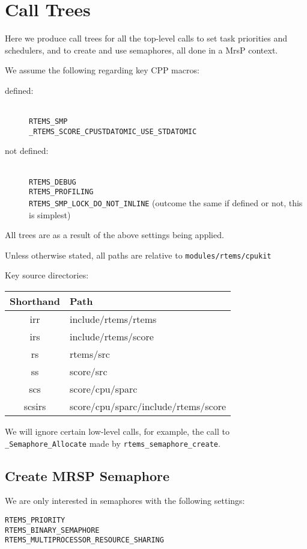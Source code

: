 \section{Call Trees}\label{sec:calltrees}

Here we produce call trees for all the top-level
calls to set task priorities and schedulers,
and to create and use semaphores,
all done in a MrsP context.

We assume the following regarding key CPP macros:
\begin{description}
  \item [defined:]~
    \\ \verb"RTEMS_SMP"
    \\ \verb"_RTEMS_SCORE_CPUSTDATOMIC_USE_STDATOMIC"
  \item [not defined:]~
    \\ \verb"RTEMS_DEBUG"
    \\ \verb"RTEMS_PROFILING"
    \\ \verb"RTEMS_SMP_LOCK_DO_NOT_INLINE"
      (outcome the same if defined or not, this is simplest)
\end{description}
All trees are as a result of the above settings being applied.

Unless otherwise stated,
all paths are relative to \texttt{modules/rtems/cpukit}

Key source directories:

\begin{tabular}{|c|l|}
\hline
 Shorthand & Path
\\\hline
 irr & include/rtems/rtems
\\\hline
 irs & include/rtems/score
\\\hline
 rs & rtems/src
\\\hline
 ss & score/src
\\\hline
 scs & score/cpu/sparc
\\\hline
 scsirs & score/cpu/sparc/include/rtems/score
\\\hline
\end{tabular}

We will ignore certain low-level calls,
for example,
the call to \verb"_Semaphore_Allocate"
made by \verb"rtems_semaphore_create".

\newpage
\subsection{Create MRSP Semaphore}

We are only interested in semaphores with the following settings:
\begin{verbatim}
RTEMS_PRIORITY
RTEMS_BINARY_SEMAPHORE
RTEMS_MULTIPROCESSOR_RESOURCE_SHARING
\end{verbatim}

